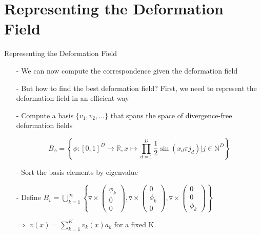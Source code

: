 \documentclass[xcolor=dvipsnames]{beamer}
\begin{document}
\section{Representing the Deformation Field}
\begin{frame}{Representing the Deformation Field}
\begin{enumerate}
\item[-] We can now compute the correspondence given the deformation field
\item[-]But how to find the best deformation field? First, we need to represent the deformation field in an efficient way
\pause
\item[-] Compute a basis $\{v_1,v_2,...\}$ that spans the space of divergence-free deformation fields
\item[] \begin{equation*}
B_\phi = \left\{\phi: [0,1]^D \rightarrow\mathbb{R}, x \mapsto\prod_{d=1}^D \frac{1}{2}\sin(x_d\pi j_d) \big\vert j \in \mathbb{N}^D\right\}
\end{equation*}
\item[-] Sort the basis elements by eigenvalue
\pause
\item[-] Define $B_v = \bigcup_{k=1}^\infty\left\{\triangledown\times\begin{pmatrix}\phi_k\\0\\0\end{pmatrix}, \triangledown\times\begin{pmatrix}0\\\phi_k\\0\end{pmatrix}, \triangledown\times\begin{pmatrix}0\\0\\\phi_k\end{pmatrix}\right\}$
\item[$\Rightarrow$] $v(x) = \sum_{k=1}^K v_k(x)a_k$ for a fixed K.
\end{enumerate}
\end{frame}
\end{document}
